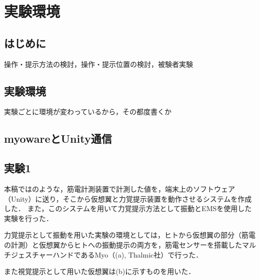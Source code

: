 \chapter[実験環境]%
        {実験環境}

\section{はじめに}
    操作・提示方法の検討，操作・提示位置の検討，被験者実験

\section{実験環境}
実験ごとに環境が変わっているから，その都度書くか

\section{myowareとUnity通信}

\section{}

\section{実験1}
    本稿ではのような，筋電計測装置で計測した値を，端末上のソフトウェア（Unity）に送り，そこから仮想翼と力覚提示装置を動作させるシステムを作成した．
    また，このシステムを用いて力覚提示方法として振動とEMSを使用した実験を行った．





    力覚提示として振動を用いた実験の環境としては，ヒトから仮想翼の部分（筋電の計測）と仮想翼からヒトへの振動提示の両方を，筋電センサーを搭載したマルチジェスチャーハンドであるMyo（(a), Thalmic社）で行った．

    また視覚提示として用いた仮想翼は(b)に示すものを用いた．

